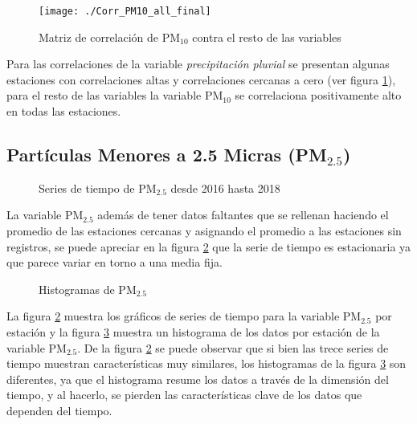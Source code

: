 \begin{figure}[H]
\centering
\texttt{[image: ./Corr\_PM10\_all\_final]}
\caption{Matriz de correlación de PM$_{10}$ contra el resto de las variables}
\label{corrPM10}
\end{figure}


Para las correlaciones de la variable {\em precipitación pluvial} se presentan algunas estaciones con correlaciones altas y correlaciones cercanas a cero (ver figura \ref{corrPM10}), para el resto de las variables la variable PM$_{10}$ se correlaciona positivamente alto en todas las estaciones.





\subsection{Partículas Menores a 2.5 Micras (PM$_{2.5}$)}
\begin{figure}[H]
\centering
{}
\caption{Series de tiempo de PM$_{2.5}$ desde 2016 hasta 2018}
\label{seriePM2_5}
\end{figure}

La variable PM$_{2.5}$ además de tener datos faltantes que se rellenan haciendo el promedio de las estaciones cercanas y asignando el promedio a las estaciones sin registros, se puede apreciar en la figura \ref{seriePM2_5} que la serie de tiempo es estacionaria ya que parece variar en torno a una media fija.

\begin{figure}[H]
\centering
{}
\caption{Histogramas de PM$_{2.5}$}
\label{histPM2_5}
\end{figure}

La figura \ref{seriePM2_5} muestra los gráficos de series de tiempo para la variable PM$_{2.5}$ por estación y la figura \ref{histPM2_5} muestra un histograma de los datos por estación de la variable PM$_{2.5}$. De la figura \ref{seriePM2_5} se puede observar que si bien las trece series de tiempo muestran características muy similares, los histogramas de la figura \ref{histPM2_5} son diferentes, ya que el histograma resume los datos a través de la dimensión del tiempo, y al hacerlo, se pierden las características clave de los datos que dependen del tiempo.

